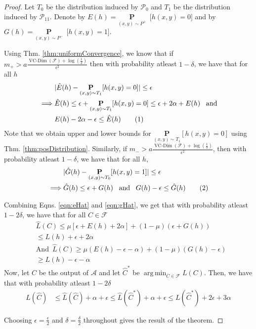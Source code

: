 \documentclass[12pt]{article}
\newcommand{\mb}{\mathbf}
\newcommand{\mc}{\mathcal}
\newcommand\numberthis{\addtocounter{equation}{1}\tag{\theequation}}
\DeclareMathOperator*{\argmin}{arg\,min}
\DeclareMathOperator*{\vcdim}{VC-Dim}
\begin{document}
\begin{proof}
Let $T_0$ be the distribution induced by $\mc P_0$ and $T_1$ be the distribution induced by $\mc P_{11}$. Denote by $E(h) = \underset{(x, y) \sim P^+}{\mb P}\enspace \big[ h(x, y) = 0 ]$ and by $G(h) = \underset{(x, y) \sim P^-}{\mb P}\enspace \big[ h(x, y) = 1 ]$. 

Using Thm. \ref{thm:uniformConvergence}, we know that if $m_+ > a\frac{\vcdim({\mc F}) + \log(\frac{1}{\delta})}{\epsilon^2}$ then with probability atleast $1-\delta$, we have that for all $h$
\begin{align*}
  &|\hat E(h) - \underset{(x,y) \sim T_1}{\mb P}[h(x, y) = 0]| \le \epsilon\\
  \implies &\hat E(h) \le \epsilon + \underset{(x,y) \sim T_1}{\mb P}[h(x, y) = 0] \le \epsilon + 2\alpha + E(h) \enspace\text{ and}\\
  &E(h) - 2\alpha -\epsilon \le \hat E(h) \numberthis \label{eqn:eHat}
\end{align*}
Note that we obtain upper and lower bounds for $\underset{(x,y) \sim T_1}{\mb P}[h(x, y) = 0]$ using Thm. \ref{thm:posDistribution}. Similarly, if $m_- > a\frac{\vcdim({\mc F}) + \log(\frac{1}{\delta})}{\epsilon^2}$, then with probability atleast $1-\delta$, we have that for all $h$,
\begin{align*}
  &|\hat G(h) - \underset{(x,y) \sim T_0}{\mb P}[h(x, y) = 1]| \le \epsilon\\
  \implies &\hat G(h) \le \epsilon + G(h) \enspace\text{ and } \enspace G(h) -\epsilon \le \hat G(h) \numberthis\label{eqn:gHat}
\end{align*}

\noindent Combining Eqns. \ref{eqn:eHat} and \ref{eqn:gHat}, we get that with probability atleast $1-2\delta$, we have that for all $C \in {\mc F}$
\begin{align*}
  &\hat L(C) \le \mu [\epsilon + E(h) + 2\alpha] + (1-\mu)(\epsilon + G(h)) \\
  &\le L(h) + \epsilon + 2\alpha\\
  &\text{And} \enspace \hat L(C) \ge \mu(E(h) -\epsilon - \alpha) + (1-\mu)(G(h) - \epsilon) \\
  &\ge L(h) - \epsilon - \alpha
\end{align*}
Now, let $\hat C$ be the output of $\mc A$ and let $\hat C^*$ be $\argmin_{C \in {\mc F}} L(C)$. Then, we have that with probability atleast $1-2\delta$
\begin{align*}
  L(\hat C) &\le \hat L(\hat C) + \alpha + \epsilon \le \hat L(\hat C^*) + \alpha + \epsilon \le L(\hat C^*) + 2\epsilon + 3\alpha 
\end{align*}

Choosing $\epsilon = \frac{\epsilon}{2}$ and $\delta = \frac{\delta}{2}$ throughout gives the result of the theorem.
\end{proof}
\end{document}
